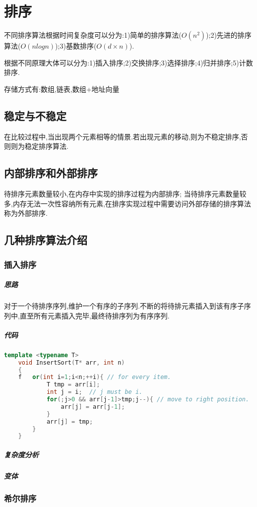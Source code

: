 \documentclass{ctexart}
\begin{document}
\section{排序}
不同排序算法根据时间复杂度可以分为:1)简单的排序算法($O(n^2)$);2)先进的排序算法($O(nlogn)$);3)基数排序($O(d\times n)$).

根据不同原理大体可以分为:1)插入排序;2)交换排序;3)选择排序;4)归并排序;5)计数排序.

存储方式有:数组,链表,数组+地址向量

\subsection{稳定与不稳定}
在比较过程中,当出现两个元素相等的情景.若出现元素的移动,则为不稳定排序,否则则为稳定排序算法.

\subsection{内部排序和外部排序}
待排序元素数量较小,在内存中实现的排序过程为内部排序;
当待排序元素数量较多,内存无法一次性容纳所有元素,在排序实现过程中需要访问外部存储的排序算法称为外部排序.

\subsection{几种排序算法介绍}
\subsubsection{插入排序}

	\subparagraph{思路}
	对于一个待排序序列,维护一个有序的子序列.不断的将待排元素插入到该有序子序列中,直至所有元素插入完毕,最终待排序列为有序序列.

	\subparagraph{代码}
	\begin{lstlisting}[language = C++, title=insert sort, frame=shadowbox, breaklines=true]
	template <typename T>
	void InsertSort(T* arr, int n)
	{
    f	or(int i=1;i<n;++i){ // for every item.
        	T tmp = arr[i];
        	int j = i;  // j must be i.
        	for(;j>0 && arr[j-1]>tmp;j--){ // move to right position.
            	arr[j] = arr[j-1];
        	}
        	arr[j] = tmp;
    	}
	}	
	\end{lstlisting}

	\subparagraph{复杂度分析}
	\subparagraph{变体}
	
	\subsubsection{希尔排序}
	
\end{document}
